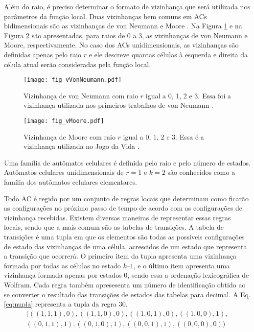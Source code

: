 Além do raio, é preciso determinar o formato de vizinhança que será utilizada nos parâmetros da função local. Duas vizinhanças bem comuns em ACs bidimensionais são as vizinhanças de von Neumann \cite{weisstein2015b} e Moore \cite{weisstein2015c}. Na Figura \ref{fig:vVonNeumann} e na Figura \ref{fig:vMoore} são apresentadas, para raios de 0 a 3, as vizinhanças de von Neumann e Moore, respectivamente. No caso dos ACs unidimensionais, as vizinhanças são definidas apenas pelo raio $r$ e ele descreve quantas células à esquerda e direita da célula atual serão consideradas pela função local.

	\begin{figure}[h!]
	  \centering
	  \texttt{[image: fig\_vVonNeumann.pdf]}
	  \caption{Vizinhança de von Neumann com raio $r$ igual a 0, 1, 2 e 3. Essa foi a vizinhança utilizada nos primeiros trabalhos de von Neumann \cite{weisstein2015b}.}
	  \label{fig:vVonNeumann}
	\end{figure}

	\begin{figure}[h!]
	  \centering
  	  \texttt{[image: fig\_vMoore.pdf]}
	  \caption{Vizinhança de Moore com raio $r$ igual a 0, 1, 2 e 3. Essa é a vizinhança utilizada no Jogo da Vida \cite{weisstein2015c}.}
	  \label{fig:vMoore}
	\end{figure}

Uma família de autômatos celulares é definida pelo raio e pelo número de estados. Autômatos celulares unidimensionais de $r=1$ e $k=2$ são conhecidos como a família dos autômatos celulares elementares.

Todo AC é regido por um conjunto de regras locais que determinam como ficarão as configurações no próximo passo de tempo de acordo com as configurações de vizinhança recebidas. Existem diversas maneiras de representar essas regras locais, sendo que a mais comum são as tabelas de transições. A tabela de transições é uma tupla em que os elementos são todas as possíveis configurações de estado das vizinhanças de uma célula, acrescidos de um estado que representa a transição que ocorrerá. O primeiro item da tupla apresenta uma vizinhança formada por todas as células no estado $k – 1$, e o último item apresenta uma vizinhança formada apenas por estados $0$, sendo essa a ordenação lexicográfica de Wolfram. Cada regra também apresesenta um número de identificação obtido ao se converter o resultado das transições de estados das tabelas para decimal. A Eq. \eqref{eq:nupla} representa a tupla da regra 30.
	\begin{equation}
	\begin{split}
	(((1,1,1),0),((1,1,0),0),((1,0,1),0),((1,0,0),1),\\
	((0,1,1),1),((0,1,0),1),((0,0,1),1),((0,0,0),0))
	\label{eq:nupla}
	\end{split}
	\end{equation}

